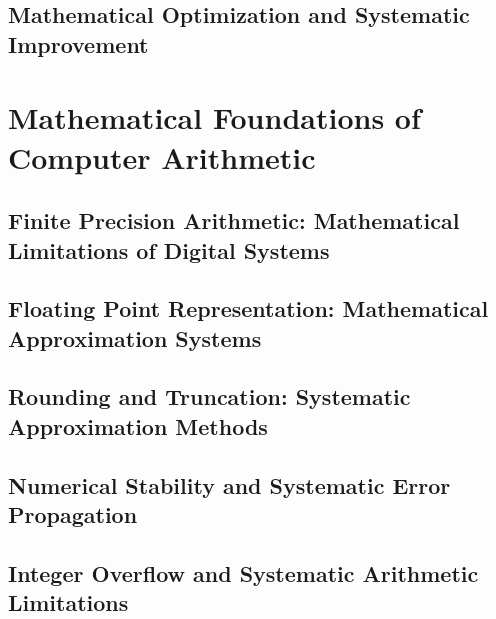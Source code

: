 \documentclass[12pt, oneside, openany]{book}
\let\oldchapter\chapter
\renewcommand{\chapter}{
	\cleardoublepage
	\thispagestyle{chapter}
	\oldchapter
}
\begin{document}
\section{Mathematical Optimization and Systematic Improvement}


\chapter{Mathematical Foundations of Computer Arithmetic}

\section{Finite Precision Arithmetic: Mathematical Limitations of Digital Systems}

\section{Floating Point Representation: Mathematical Approximation Systems}

\section{Rounding and Truncation: Systematic Approximation Methods}

\section{Numerical Stability and Systematic Error Propagation}

\section{Integer Overflow and Systematic Arithmetic Limitations}
\end{document}
